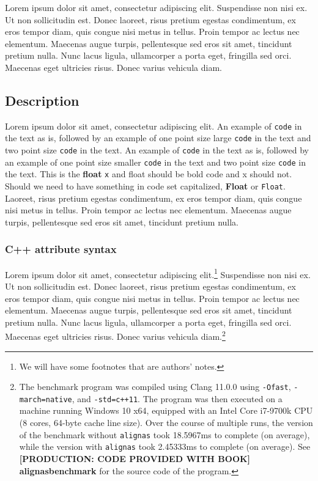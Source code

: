 

Lorem ipsum dolor sit amet, consectetur
adipiscing elit. Suspendisse non nisi ex. Ut non sollicitudin est. Donec
laoreet, risus pretium egestas condimentum, ex eros tempor diam, quis
congue nisi metus in tellus. Proin tempor ac lectus nec elementum.
Maecenas augue turpis, pellentesque sed eros sit amet, tincidunt pretium
nulla. Nunc lacus ligula, ullamcorper a porta eget, fringilla sed orci.
Maecenas eget ultricies risus. Donec varius vehicula diam.

\subsection[Description]{Description}\label{description}

Lorem ipsum dolor sit amet, consectetur
adipiscing elit. An example of \texttt{code} in the text as is, followed by an example of one point size large {\tt\large code} in the text and two point size {\tt\Large code} in the text. An example of \texttt{code} in the text as is, followed by an example of one point size smaller {\tt\small code} in the text and two point size {\tt\footnotesize code} in the text. This is the {\ttfamily\bfseries float} \texttt{x} and float should be bold code and x should not. Should we need to have something in code set capitalized, {\ttfamily\bfseries Float} or \texttt{Float}. Laoreet, risus pretium egestas condimentum, ex eros tempor diam, quis
congue nisi metus in tellus. Proin tempor ac lectus nec elementum.
Maecenas augue turpis, pellentesque sed eros sit amet, tincidunt pretium
nulla. 

\subsubsection[C++ attribute syntax]{C++ attribute syntax}\label{c++-attribute-syntax}

Lorem ipsum dolor sit amet, consectetur
adipiscing elit.{\cprotect\footnote{\authorsnote We will have
some footnotes that are authors' notes.}} Suspendisse non nisi ex. Ut non sollicitudin est. Donec
laoreet, risus pretium egestas condimentum, ex eros tempor diam, quis
congue nisi metus in tellus. Proin tempor ac lectus nec elementum.
Maecenas augue turpis, pellentesque sed eros sit amet, tincidunt pretium
nulla. Nunc lacus ligula, ullamcorper a porta eget, fringilla sed orci.
Maecenas eget ultricies risus. Donec varius vehicula diam.{\cprotect\footnote{The benchmark
program was compiled using Clang 11.0.0 using \texttt{-Ofast},
\texttt{-march=native}, and \mbox{\texttt{-std=c++11}}. The program was then
executed on a machine running Windows 10 x64, equipped with an Intel
Core i7-9700k CPU (8 cores, 64-byte cache line size). Over the
course of multiple runs, the version of the benchmark without
\texttt{alignas} took 18.5967ms to complete (on average), while the
version with \texttt{alignas} took 2.45333ms to complete (on average).
  See \textbf{{[PRODUCTION: CODE PROVIDED WITH BOOK] alignasbenchmark}} for the source code of the program.}}
  


